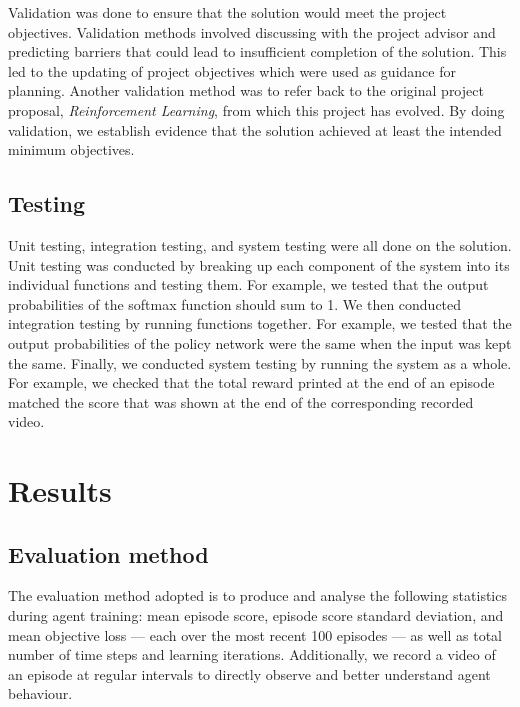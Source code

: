 \documentclass[12pt,a4paper]{article}
\begin{document}

Validation was done to ensure that the solution would meet the project objectives. Validation methods involved discussing with the project advisor and predicting barriers that could lead to insufficient completion of the solution. This led to the updating of project objectives which were used as guidance for planning. Another validation method was to refer back to the original project proposal, \textit{Reinforcement Learning}, from which this project has evolved. By doing validation, we establish evidence that the solution achieved at least the intended minimum objectives.  

\subsection{Testing}
Unit testing, integration testing, and system testing were all done on the solution. Unit testing was conducted by breaking up each component of the system into its individual functions and testing them. For example, we tested that the output probabilities of the softmax function should sum to 1. We then conducted integration testing by running functions together. For example, we tested that the output probabilities of the policy network were the same when the input was kept the same. Finally, we conducted system testing by running the system as a whole. For example, we checked that the total reward printed at the end of an episode matched the score that was shown at the end of the corresponding recorded video.

\section{Results}
\subsection{Evaluation method}
The evaluation method adopted is to produce and analyse the following statistics during agent training: mean episode score, episode score standard deviation, and mean objective loss --- each over the most recent 100 episodes --- as well as total number of time steps and learning iterations. Additionally, we record a video of an episode at regular intervals to directly observe and better understand agent behaviour.
\end{document}
